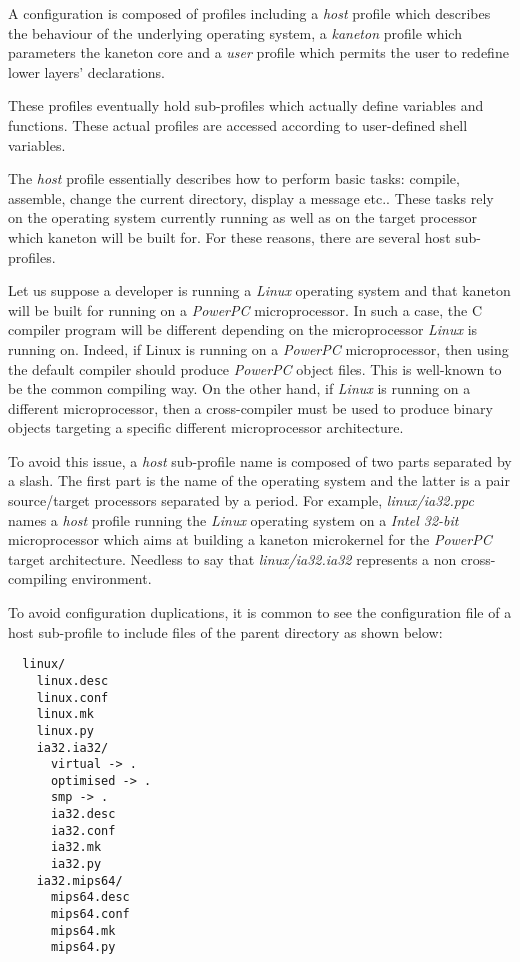 A configuration is composed of profiles including a \textit{host} profile which
describes the behaviour of the underlying operating system, a \textit{kaneton}
profile which parameters the kaneton core and a \textit{user} profile which
permits the user to redefine lower layers' declarations.

These profiles eventually hold sub-profiles which actually define variables
and functions. These actual profiles are accessed according to user-defined
shell variables.



The \textit{host} profile essentially describes how to perform basic tasks:
compile, assemble, change the current directory, display a message etc.. These
tasks rely on the operating system currently running as well as on the target
processor which kaneton will be built for. For these reasons, there are
several host sub-profiles.

Let us suppose a developer is running a \textit{Linux} operating system and
that kaneton will be built for running on a \textit{PowerPC} microprocessor. In
such a case, the C compiler program will be different depending on the
microprocessor \textit{Linux} is running on. Indeed, if Linux is running on
a \textit{PowerPC} microprocessor, then using the default compiler should
produce \textit{PowerPC} object files. This is well-known to be the common
compiling way. On the other hand, if \textit{Linux} is running on a
different microprocessor, then a cross-compiler must be used to produce
binary objects targeting a specific different microprocessor architecture.

To avoid this issue, a \textit{host} sub-profile name is composed of two parts
separated by a slash. The first part is the name of the operating system and
the latter is a pair source/target processors separated by a period. For
example, \textit{linux/ia32.ppc} names a \textit{host} profile running the
\textit{Linux} operating system on a \textit{Intel 32-bit} microprocessor
which aims at building a kaneton microkernel for the \textit{PowerPC}
target architecture. Needless to say that \textit{linux/ia32.ia32} represents
a non cross-compiling environment.

To avoid configuration duplications, it is common to see the configuration
file of a host sub-profile to include files of the parent directory as
shown below:

\begin{verbatim}
  linux/
    linux.desc
    linux.conf
    linux.mk
    linux.py
    ia32.ia32/
      virtual -> .
      optimised -> .
      smp -> .
      ia32.desc
      ia32.conf
      ia32.mk
      ia32.py
    ia32.mips64/
      mips64.desc
      mips64.conf
      mips64.mk
      mips64.py
\end{verbatim}

